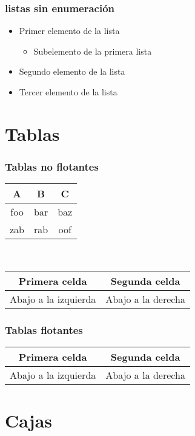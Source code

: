 \documentclass[a4paper,11pt]{article}
\begin{document}
\section{listas sin enumeración}
\begin{itemize}
 \item Primer elemento de la lista
 \begin{itemize}
   \item Subelemento de la primera lista
 \end{itemize}
 \item Segundo elemento de la lista
 \item Tercer elemento de la lista
\end{itemize}%
\part{Tablas}
\section{Tablas no flotantes}
\begin{tabular}{|c|c|c|}
\hline
A & B & C\\
\hline\hline
foo & bar & baz\\
\hline
zab & rab & oof\\
\hline
\end{tabular}
\\
\begin{tabular}{|c|c|}
\hline%
Primera celda & Segunda celda \\
\hline
  Abajo a la izquierda & Abajo a la derecha \\
\hline
\end{tabular}
\section{Tablas flotantes}

\begin{table}%
\begin{tabular}{|c||c|}
\hline
Primera celda & Segunda celda \\
\hline
Abajo a la izquierda & Abajo a la derecha \\
\hline
\end{tabular}
\end{table}
\part{Cajas}
\end{document}
